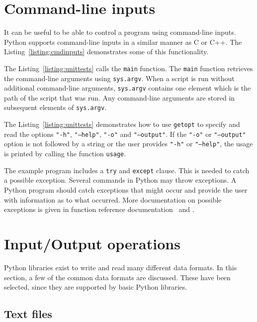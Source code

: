 \documentclass[11pt,a4paper]{article}
\begin{document}
\section{Command-line inputs}

It can be useful to be able to control a program using command-line inputs.  Python supports command-line inputs in a similar manner as C or C++.  The Listing~\ref{listing:cmdinputs} demonstrates some of this functionality.



The Listing~\ref{listing:unittests} calls the \texttt{main} function.  The \texttt{main} function retrieves the command-line arguments using \texttt{sys.argv}.  When a script is run without additional command-line arguments, \texttt{sys.argv} contains one element which is the path of the script that was run.  Any command-line arguments are stored in subsequent elements of \texttt{sys.argv}.

The Listing~\ref{listing:unittests} demonstrates how to use \texttt{getopt} to specify and read the options \texttt{"-h"}, \texttt{"--help"}, \texttt{"-o"} and \texttt{"--output"}.  If the  \texttt{"-o"} or \texttt{"--output"} option is not followed by a string or the user provides \texttt{"-h"} or \texttt{"--help"}, the usage is printed by calling the function \texttt{usage}.

The example program includes a \texttt{try} and \texttt{except} clause.  This is needed to catch a possible exception.  Several commands in Python may throw exceptions.  A Python program should catch exceptions that might occur and provide the user with information as to what occurred.  More documentation on possible exceptions is given in function reference documentation~\cite{python-doc} and \cite{python-w3schools}.

\section{Input/Output operations}

Python libraries exist to write and read many different data formats.  In this section, a few of the common data formats are discussed.  These have been selected, since they are supported by basic Python libraries.

\subsection{Text files}
\end{document}
